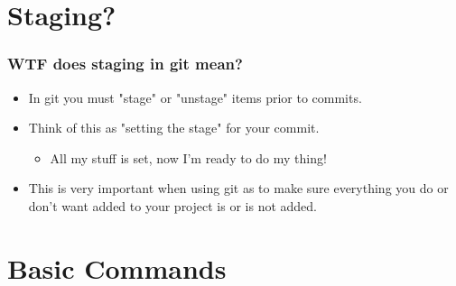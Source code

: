 \documentclass{beamer}
\begin{document}
\section{Staging?}
\begin{frame}
    \frametitle{WTF does staging in git mean?}
    \begin{itemize}
        \item{In git you must "stage" or "unstage" items prior to commits.}
        \item{Think of this as "setting the stage" for your commit.}
            \begin{itemize}
                \item{All my stuff is set, now I'm ready to do my thing!}
            \end{itemize}
        \item{This is very important when using git as to make sure everything you do or don't want added to your project is or is not added.}
    \end{itemize}
\end{frame}

\section{Basic Commands}
\end{document}
